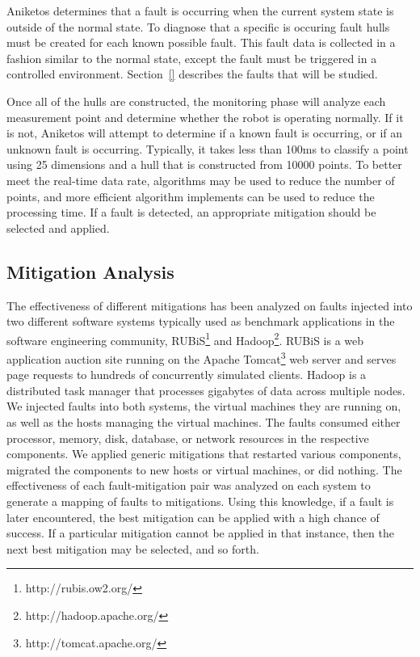 Aniketos determines that a fault is occurring when the current system state is outside of the normal state. To diagnose that a specific is occuring fault hulls must be created for each known possible fault. This fault data is collected in a fashion similar to the normal state, except the fault must be triggered in a controlled environment. Section~\ref{} describes the faults that will be studied.

Once all of the hulls are constructed, the monitoring phase will analyze each measurement point and determine whether the robot is operating normally. If it is not, Aniketos will attempt to determine if a known fault is occurring, or if an unknown fault is occurring. Typically, it takes less than 100ms to classify a point using 25 dimensions and a hull that is constructed from 10000 points. To better meet the real-time data rate, algorithms may be used to reduce the number of points, and more efficient algorithm implements can be used to reduce the processing time. If a fault is detected, an appropriate mitigation should be selected and applied.


\subsection{Mitigation Analysis}
\label{sub:mitigation_analysis}
The effectiveness of different mitigations has been analyzed on faults injected into two different software systems typically used as benchmark applications in the software engineering community, RUBiS\footnote{http://rubis.ow2.org/} and Hadoop\footnote{http://hadoop.apache.org/}. RUBiS is a web application auction site running on the Apache Tomcat\footnote{http://tomcat.apache.org/} web server and serves page requests to hundreds of concurrently simulated clients. Hadoop is a distributed task manager that processes gigabytes of data across multiple nodes. We injected faults into both systems, the virtual machines they are running on, as well as the hosts managing the virtual machines. The faults consumed either processor, memory, disk, database, or network resources in the respective components. We applied generic mitigations that restarted various components, migrated the components to new hosts or virtual machines, or did nothing. The effectiveness of each fault-mitigation pair was analyzed on each system to generate a mapping of faults to mitigations. Using this knowledge, if a fault is later encountered, the best mitigation can be applied with a high chance of success. If a particular mitigation cannot be applied in that instance, then the next best mitigation may be selected, and so forth.

